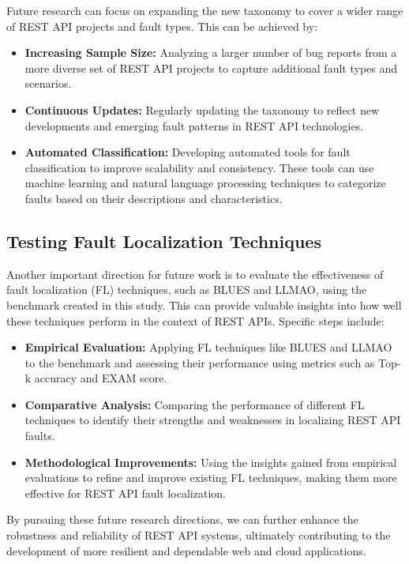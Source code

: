 \documentclass[conference]{IEEEtran}
\begin{document}
Future research can focus on expanding the new taxonomy to cover a wider range of REST API projects and fault types. This can be achieved by:
\begin{itemize}
    \item \textbf{Increasing Sample Size:} Analyzing a larger number of bug reports from a more diverse set of REST API projects to capture additional fault types and scenarios.
    \item \textbf{Continuous Updates:} Regularly updating the taxonomy to reflect new developments and emerging fault patterns in REST API technologies.
    \item \textbf{Automated Classification:} Developing automated tools for fault classification to improve scalability and consistency. These tools can use machine learning and natural language processing techniques to categorize faults based on their descriptions and characteristics.
\end{itemize}

\subsection{Testing Fault Localization Techniques}

Another important direction for future work is to evaluate the effectiveness of fault localization (FL) techniques, such as BLUES and LLMAO, using the benchmark created in this study. This can provide valuable insights into how well these techniques perform in the context of REST APIs. Specific steps include:
\begin{itemize}
    \item \textbf{Empirical Evaluation:} Applying FL techniques like BLUES and LLMAO to the benchmark and assessing their performance using metrics such as Top-k accuracy and EXAM score.
    \item \textbf{Comparative Analysis:} Comparing the performance of different FL techniques to identify their strengths and weaknesses in localizing REST API faults.
    \item \textbf{Methodological Improvements:} Using the insights gained from empirical evaluations to refine and improve existing FL techniques, making them more effective for REST API fault localization.
\end{itemize}

By pursuing these future research directions, we can further enhance the robustness and reliability of REST API systems, ultimately contributing to the development of more resilient and dependable web and cloud applications.



\end{document}
